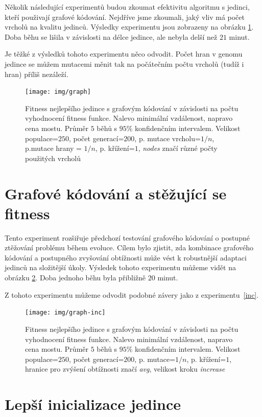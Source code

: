 Několik následující experimentů budou zkoumat efektivitu algoritmu s jedinci, kteří použivají grafové kódování. Nejdříve jsme zkoumali, jaký vliv má počet vrcholů na kvalitu jedinců. Výsledky experimentu jsou zobrazeny na obrázku \ref{exp:7}. Doba běhu se lišila v závislosti na délce jedince, ale nebyla delší než $21$ minut.

Je těžké z výsledků tohoto experimentu něco odvodit. Počet hran v genomu jedince se můžem mutacemi měnit tak na počátečním počtu vrcholů (tudíž i hran) příliš nezáleží.

\begin{figure}[p]\centering
\texttt{[image: img/graph]}
\caption{Fitness nejlepšího jedince s grafovým kódování v závislosti na počtu vyhodnocení fitness funkce. Nalevo minimální vzdálenost, napravo cena mostu. Průměr $5$ běhů s $95\%$ konfidenčním intervalem. Velikost populace=$250$, počet generací=$200$, p. mutace vrcholu=$1/n$, p.mutace hrany = $1/n$, p. křížení=$1$, \emph{nodes} značí různé počty použitých vrcholů}
\label{exp:7}
\end{figure}


\section{Grafové kódování a stěžující se fitness}

Tento experiment rozšiřuje předchozí testování grafového kódování o postupné ztěžování problému během evoluce. Cílem bylo zjistit, zda kombinace grafového kódování a postupného zvyšování obtížnosti může vést k robustnější adaptaci jedinců na složitější úkoly. Výsledek tohoto experimentu můžeme vidět na obrázku \ref{exp:8}. Doba jednoho běhu byla přibližně $20$ minut.

Z tohoto experimentu můžeme odvodit podobné závery jako z experimentu~\ref{inc}. 

\begin{figure}[p]\centering
\texttt{[image: img/graph-inc]}
\caption{Fitness nejlepšího jedince s grafovým kódování v závislosti na počtu vyhodnocení fitness funkce. Nalevo minimální vzdálenost, napravo cena mostu. Průměr $5$ běhů s $95\%$ konfidenčním intervalem. Velikost populace=$250$, počet generací=$200$, p. mutace=$1/n$, p. křížení=$1$, hranice pro zvýšení obtížnosti značí \emph{avg}, velikost kroku \emph{increase}}
\label{exp:8}
\end{figure}


\section{Lepší inicializace jedince}

